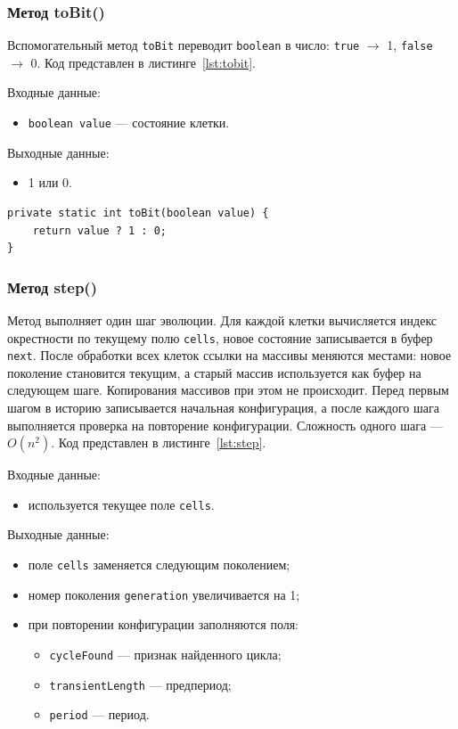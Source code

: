 \subsubsection*{Метод toBit()}

Вспомогательный метод \texttt{toBit} переводит \texttt{boolean} в число: \texttt{true} $\to$ 1, \texttt{false} $\to$ 0. Код представлен в листинге~\ref{lst:tobit}.

Входные данные:
\begin{itemize}
	\item \texttt{boolean value} --- состояние клетки.
\end{itemize}

Выходные данные:
\begin{itemize}
	\item 1 или 0.
\end{itemize}

\begin{lstlisting}[caption={Метод toBit()}, label={lst:tobit}]
private static int toBit(boolean value) {
	return value ? 1 : 0;
}
\end{lstlisting}

\subsubsection*{Метод step()}

Метод выполняет один шаг эволюции. Для каждой клетки вычисляется индекс окрестности по текущему полю \texttt{cells}, новое состояние записывается в буфер \texttt{next}. После обработки всех клеток ссылки на массивы меняются местами: новое поколение становится текущим, а старый массив используется как буфер на следующем шаге. Копирования массивов при этом не происходит. Перед первым шагом в историю записывается начальная конфигурация, а после каждого шага выполняется проверка на повторение конфигурации. Сложность одного шага --- $O(n^2)$. Код представлен в листинге~\ref{lst:step}.

Входные данные:
\begin{itemize}
	\item используется текущее поле \texttt{cells}.
\end{itemize}

Выходные данные:
\begin{itemize}
	\item поле \texttt{cells} заменяется следующим поколением;
	\item номер поколения \texttt{generation} увеличивается на 1;
	\item при повторении конфигурации заполняются поля:
	\begin{itemize}
		\item \texttt{cycleFound} --- признак найденного цикла;
		\item \texttt{transientLength} --- предпериод;
		\item \texttt{period} --- период.
	\end{itemize}
\end{itemize}

